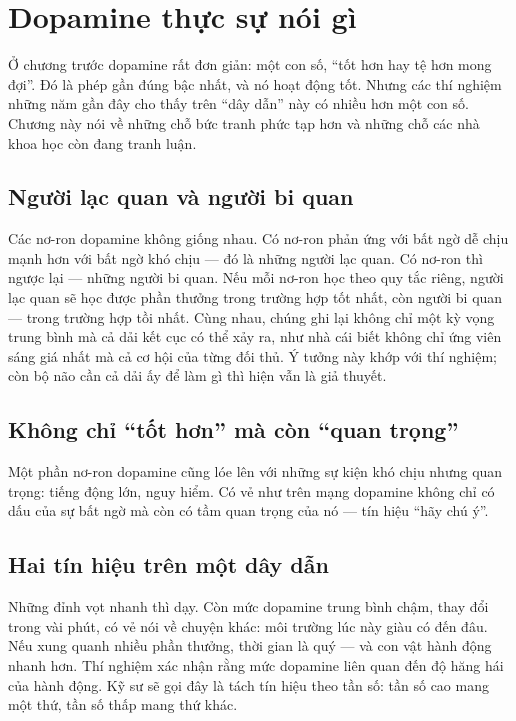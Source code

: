 \chapter{Dopamine thực sự nói gì}

Ở chương trước dopamine rất đơn giản: một con số, ``tốt hơn hay tệ hơn mong đợi''. Đó là phép gần đúng bậc nhất, và nó hoạt động tốt. Nhưng các thí nghiệm những năm gần đây cho thấy trên ``dây dẫn'' này có nhiều hơn một con số. Chương này nói về những chỗ bức tranh phức tạp hơn và những chỗ các nhà khoa học còn đang tranh luận.

\section*{Người lạc quan và người bi quan}

Các nơ-ron dopamine không giống nhau. Có nơ-ron phản ứng với bất ngờ dễ chịu mạnh hơn với bất ngờ khó chịu --- đó là những người lạc quan. Có nơ-ron thì ngược lại --- những người bi quan. Nếu mỗi nơ-ron học theo quy tắc riêng, người lạc quan sẽ học được phần thưởng trong trường hợp tốt nhất, còn người bi quan --- trong trường hợp tồi nhất. Cùng nhau, chúng ghi lại không chỉ một kỳ vọng trung bình mà cả dải kết cục có thể xảy ra, như nhà cái biết không chỉ ứng viên sáng giá nhất mà cả cơ hội của từng đối thủ. Ý tưởng này khớp với thí nghiệm; còn bộ não cần cả dải ấy để làm gì thì hiện vẫn là giả thuyết.


\section*{Không chỉ ``tốt hơn'' mà còn ``quan trọng''}

Một phần nơ-ron dopamine cũng lóe lên với những sự kiện khó chịu nhưng quan trọng: tiếng động lớn, nguy hiểm. Có vẻ như trên mạng dopamine không chỉ có dấu của sự bất ngờ mà còn có tầm quan trọng của nó --- tín hiệu ``hãy chú ý''.

\section*{Hai tín hiệu trên một dây dẫn}

Những đỉnh vọt nhanh thì dạy. Còn mức dopamine trung bình chậm, thay đổi trong vài phút, có vẻ nói về chuyện khác: môi trường lúc này giàu có đến đâu. Nếu xung quanh nhiều phần thưởng, thời gian là quý --- và con vật hành động nhanh hơn. Thí nghiệm xác nhận rằng mức dopamine liên quan đến độ hăng hái của hành động. Kỹ sư sẽ gọi đây là tách tín hiệu theo tần số: tần số cao mang một thứ, tần số thấp mang thứ khác.

